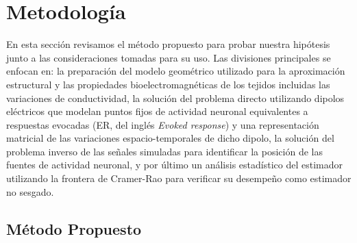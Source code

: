 %
\chapter{Metodología}
\label{sec:methodology}

En esta sección revisamos el método propuesto para probar nuestra hipótesis junto a las consideraciones tomadas para su uso.
Las divisiones principales se enfocan en: la preparación del modelo geométrico utilizado para la aproximación estructural y las propiedades bioelectromagnéticas de los tejidos incluidas las variaciones de conductividad, la solución del problema directo utilizando dipolos eléctricos que modelan puntos fijos de actividad neuronal equivalentes a respuestas evocadas (ER, del inglés \emph{Evoked response}) y una representación matricial de las variaciones espacio-temporales de dicho dipolo, la solución del problema inverso de las señales simuladas para identificar la posición de las fuentes de actividad neuronal, y por último un análisis estadístico del estimador utilizando la frontera de Cramer-Rao para verificar su desempeño como estimador no sesgado.

\section{Método Propuesto}
\label{sec:methodology:method}

